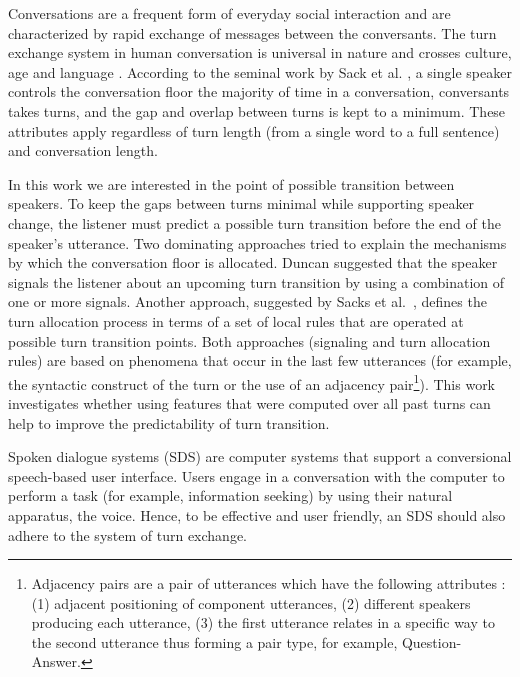 Conversations are a frequent form of everyday social interaction and are characterized by rapid exchange of messages between the conversants.
The turn exchange system in human conversation is universal in nature and crosses culture, age and language \cite{levinson2016turn}. According to the
seminal work by Sack et al. \cite{sacks1974simplest}, a single speaker controls the conversation floor the majority of time in a conversation, conversants takes turns, and the gap and overlap between turns is kept to a minimum. These attributes apply regardless of turn length (from a single word to a full sentence) and conversation length.

In this work we are interested in the point of possible transition between speakers. To keep the gaps between turns minimal while supporting speaker change, the listener
must predict a possible turn transition before the end of the speaker's utterance. Two dominating approaches tried to explain the mechanisms by which
the conversation floor is allocated. Duncan \cite{duncan1972some} suggested that the speaker signals the listener about an upcoming turn transition by using a combination of one or more signals.
Another approach, suggested by Sacks et al.~\cite{sacks1974simplest}, defines the turn allocation process in terms of a set of local rules that are operated at possible turn transition points.
Both approaches (signaling and turn allocation rules) are based on phenomena that occur in the last few utterances (for example, the syntactic construct of the turn or the use of an adjacency pair\footnote{Adjacency pairs are a pair of utterances which have the following attributes
\cite{Schegloff1973-SCHOUC}: (1) adjacent positioning of component utterances, (2) different speakers producing each utterance, (3) the first utterance relates in a specific way to the second utterance thus forming a pair type, for example, Question-Answer.}). This work investigates whether using features that were computed over all past turns can help to improve the predictability of turn transition.

Spoken dialogue systems (SDS) are computer systems that support a conversional speech-based user interface. Users engage in a conversation with the computer to
perform a task (for example, information seeking) by using their natural apparatus, the voice. Hence, to be effective and user friendly, an SDS should also adhere to the system of turn exchange.

